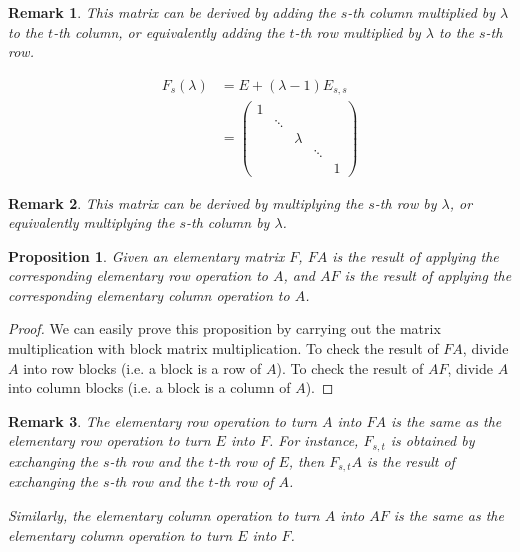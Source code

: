\documentclass[onecolumn]{ctexart}
\newtheorem{proposition}{Proposition}
\newtheorem{remark}{Remark}
\begin{document}
\begin{remark}
  This matrix can be derived by adding the $s$-th column multiplied by $\lambda$ 
  to the $t$-th column, or equivalently adding the $t$-th row multiplied by 
  $\lambda$ to the $s$-th row.
\end{remark}
\begin{equation}
  \begin{split}
    F_{s}(\lambda) &= E + (\lambda - 1)E_{s,s} \\
                   &= 
                   \begin{pmatrix}
                     1 \\
                       & \ddots \\
                       &        & \lambda \\
                       &        &         & \ddots \\
                       &        &         &        & 1
                   \end{pmatrix}
  \end{split}
\end{equation}
\begin{remark}
  This matrix can be derived by multiplying the $s$-th row by $\lambda$, or 
  equivalently multiplying the $s$-th column by $\lambda$.
\end{remark}

\begin{proposition}
  Given an elementary matrix $F$, $FA$ is the result of applying the 
  corresponding elementary row operation to $A$, and $AF$ is the result of 
  applying the corresponding elementary column operation to $A$.
\end{proposition}
\begin{proof}
  We can easily prove this proposition by carrying out the matrix multiplication 
  with block matrix multiplication. To check the result of $FA$, divide $A$ into 
  row blocks (i.e. a block is a row of $A$). To check the result of $AF$, divide 
  $A$ into column blocks (i.e. a block is a column of $A$).
\end{proof}
\begin{remark}
  The elementary row operation to turn $A$ into $FA$ is the same as the 
  elementary row operation to turn $E$ into $F$. For instance, $F_{s,t}$ is 
  obtained by exchanging the $s$-th row and the $t$-th row of $E$, then 
  $F_{s,t}A$ is the result of exchanging the $s$-th row and the $t$-th row of 
  $A$.

  Similarly, the elementary column operation to turn $A$ into $AF$ is the same 
  as the elementary column operation to turn $E$ into $F$.
\end{remark}
\end{document}
